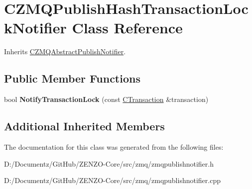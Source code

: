 \hypertarget{class_c_z_m_q_publish_hash_transaction_lock_notifier}{}\section{C\+Z\+M\+Q\+Publish\+Hash\+Transaction\+Lock\+Notifier Class Reference}
\label{class_c_z_m_q_publish_hash_transaction_lock_notifier}


Inherits \mbox{\hyperlink{class_c_z_m_q_abstract_publish_notifier}{C\+Z\+M\+Q\+Abstract\+Publish\+Notifier}}.

\subsection*{Public Member Functions}
\begin{DoxyCompactItemize}
\item 
\mbox{\label{class_c_z_m_q_publish_hash_transaction_lock_notifier_aa1cd9bd83e39750a62d92d37a2242fe1}} 
bool {\bfseries Notify\+Transaction\+Lock} (const \mbox{\hyperlink{class_c_transaction}{C\+Transaction}} \&transaction)
\end{DoxyCompactItemize}
\subsection*{Additional Inherited Members}


The documentation for this class was generated from the following files\+:\begin{DoxyCompactItemize}
\item 
D\+:/\+Documentz/\+Git\+Hub/\+Z\+E\+N\+Z\+O-\/\+Core/src/zmq/zmqpublishnotifier.\+h\item 
D\+:/\+Documentz/\+Git\+Hub/\+Z\+E\+N\+Z\+O-\/\+Core/src/zmq/zmqpublishnotifier.\+cpp\end{DoxyCompactItemize}
